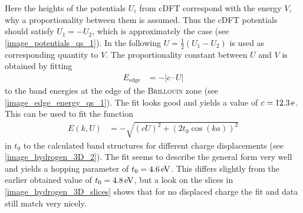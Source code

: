 Here the heights of the potentials $U_i$ from cDFT correspond with the energy $V$, why a proportionality between them is assumed. Thus the cDFT potentials should satisfy $U_1 = - U_2$, which is approximately the case (see \cref{image_potentials_qs_1}). In the following $U = \frac{1}{2}(U_1 - U_2)$ is used as corresponding quantity to $V$. The proportionality constant between $U$ and $V$ is obtained by fitting
\begin{align}
	E_\text{edge} &= -\left|c \cdot U\right|
\end{align}
to the band energies at the edge of the \textsc{Brillouin} zone (see \cref{image_edge_energy_qs_1}). The fit looks good and yields a value of $c = \unit[12.3]{e}$.\\
This can be used to fit the function
\begin{align}
	E\left(k, U\right) &= - \sqrt{\left(cU\right)^2 + \left(2t_0\cos(ka)\right)^2}
\end{align}
in $t_0$ to the calculated band structures for different charge displacements (see \cref{image_hydrogen_3D_2}). The fit seems to describe the general form very well and yields a hopping parameter of $t_0 = \unit[4.6]{eV}$. This differs slightly from the earlier obtained value of $t_0 = \unit[4.8]{eV}$, but a look on the slices in \cref{image_hydrogen_3D_slices} shows that for no displaced charge the fit and data still match very nicely.

